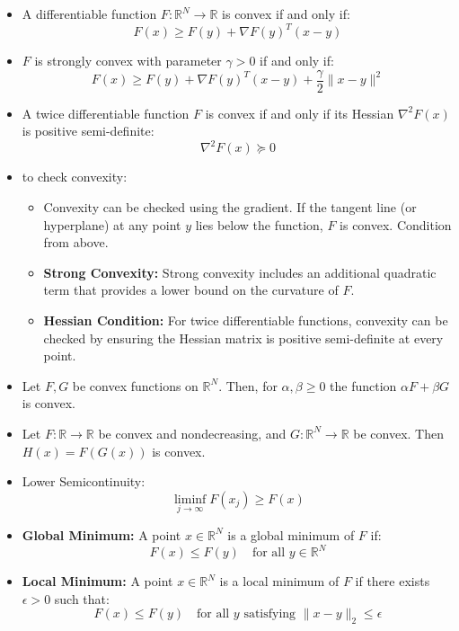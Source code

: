 \documentclass{article}
\begin{document}
\begin{itemize}
\item A differentiable function $F : \mathbb{R}^N \rightarrow \mathbb{R}$ is convex if and only if:
    \[
    F(x) \geq F(y) + \nabla F(y)^T (x - y)
    \]

 \item $F$ is strongly convex with parameter $\gamma > 0$ if and only if:
    \[
    F(x) \geq F(y) + \nabla F(y)^T (x - y) + \frac{\gamma}{2} \| x - y \|^2
    \]

\item A twice differentiable function $F$ is convex if and only if its Hessian $\nabla^2 F(x)$ is positive semi-definite:
    \[
    \nabla^2 F(x) \succeq 0
    \]

\item to check convexity:

\begin{itemize}
    \item Convexity can be checked using the gradient. If the tangent line (or hyperplane) at any point $y$ lies below the function, $F$ is convex. Condition from above.
    \item \textbf{Strong Convexity:} Strong convexity includes an additional quadratic term that provides a lower bound on the curvature of $F$.
    \item \textbf{Hessian Condition:} For twice differentiable functions, convexity can be checked by ensuring the Hessian matrix is positive semi-definite at every point.
    
\end{itemize}

    \item Let $F, G$ be convex functions on $\mathbb{R}^N$. Then, for $\alpha, \beta \geq 0$ the function $\alpha F + \beta G$ is convex.
    \item Let $F : \mathbb{R} \rightarrow \mathbb{R}$ be convex and nondecreasing, and $G : \mathbb{R}^N \rightarrow \mathbb{R}$ be convex. Then $H(x) = F(G(x))$ is convex.

\item Lower Semicontinuity:
 \[
    \liminf_{j \to \infty} F(x_j) \geq F(x)
    \]

 \item \textbf{Global Minimum:} A point \( x \in \mathbb{R}^N \) is a global minimum of \( F \) if:
    \[
    F(x) \leq F(y) \quad \text{for all } y \in \mathbb{R}^N
    \]
    \item \textbf{Local Minimum:} A point \( x \in \mathbb{R}^N \) is a local minimum of \( F \) if there exists \( \epsilon > 0 \) such that:
    \[
    F(x) \leq F(y) \quad \text{for all } y \text{ satisfying } \| x - y \|_2 \leq \epsilon
    \]


\end{itemize}
\end{document}
